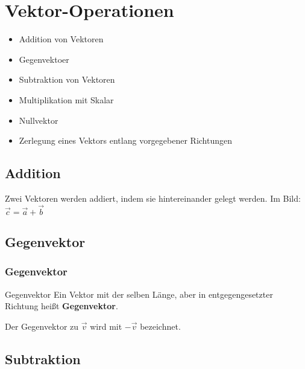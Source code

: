 \section{Vektor-Operationen}

\begin{itemize}
\item Addition von Vektoren
\item Gegenvektoer
\item Subtraktion von Vektoren
\item Multiplikation mit Skalar
\item Nullvektor
\item Zerlegung eines Vektors entlang vorgegebener Richtungen
\end{itemize}



\subsection{Addition}

Zwei Vektoren werden addiert, indem sie hintereinander gelegt
werden. Im Bild: $\vec{c} = \vec{a} + \vec{b}$

\newpage


\subsection{Gegenvektor}


\subsubsection{Gegenvektor}
\begin{definition}{Gegenvektor}{}
  Ein Vektor mit der selben Länge, aber in entgegengesetzter Richtung
  heißt \textbf{Gegenvektor}.

  Der Gegenvektor zu $\vec{v}$ wird mit $-\vec{v}$ bezeichnet.
\end{definition}


\subsection{Subtraktion}



